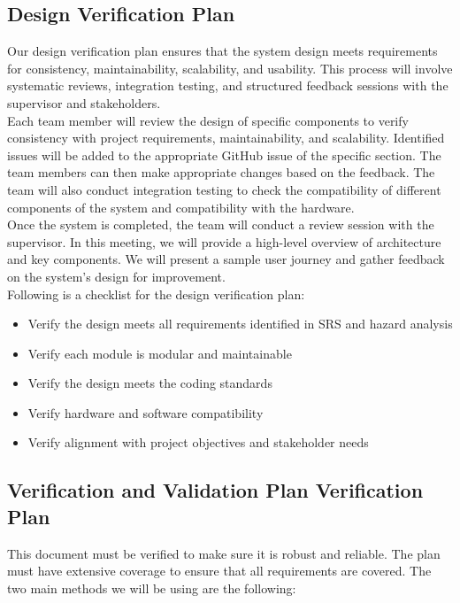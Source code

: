 \documentclass[12pt, titlepage]{article}
\begin{document}
\subsection{Design Verification Plan} \label{section:3.3}

Our design verification plan ensures that the system design meets requirements for consistency, maintainability, scalability, and usability. This process will involve systematic reviews, integration testing, and structured feedback sessions with the supervisor and stakeholders.\\
Each team member will review the design of specific components to verify consistency with project requirements, maintainability, and scalability. Identified issues will be added to the appropriate GitHub issue of the specific section. The team members can then make appropriate changes based on the feedback. The team will also conduct integration testing to check the compatibility of different components of the system and compatibility with the hardware.\\
Once the system is completed, the team will conduct a review session with the supervisor. In this meeting, we will provide a high-level overview of architecture and key components. We will present a sample user journey and gather feedback on the system's design for improvement. \\

Following is a checklist for the design verification plan: 
\begin{itemize}
  \item Verify the design meets all requirements identified in SRS and hazard analysis
  \item Verify each module is modular and maintainable
  \item Verify the design meets the coding standards
  \item Verify hardware and software compatibility
  \item Verify alignment with project objectives and stakeholder needs
\end{itemize}

\subsection{Verification and Validation Plan Verification Plan} \label{section:3.4}

This document must be verified to make sure it is robust and reliable. The plan must have extensive coverage to ensure that all requirements are covered. The two main methods we will be using are the following:
\end{document}
